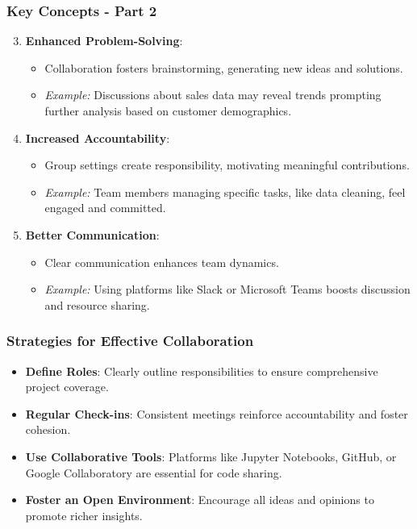 \documentclass[aspectratio=169]{beamer}
\begin{document}
\begin{frame}[fragile]
    \frametitle{Key Concepts - Part 2}
    \begin{enumerate}
        \setcounter{enumi}{2}
        \item \textbf{Enhanced Problem-Solving}:
            \begin{itemize}
                \item Collaboration fosters brainstorming, generating new ideas and solutions.
                \item \textit{Example:} Discussions about sales data may reveal trends prompting further analysis based on customer demographics.
            \end{itemize}

        \item \textbf{Increased Accountability}:
            \begin{itemize}
                \item Group settings create responsibility, motivating meaningful contributions.
                \item \textit{Example:} Team members managing specific tasks, like data cleaning, feel engaged and committed.
            \end{itemize}

        \item \textbf{Better Communication}:
            \begin{itemize}
                \item Clear communication enhances team dynamics.
                \item \textit{Example:} Using platforms like Slack or Microsoft Teams boosts discussion and resource sharing.
            \end{itemize}
    \end{enumerate}
\end{frame}

\begin{frame}[fragile]
    \frametitle{Strategies for Effective Collaboration}
    \begin{itemize}
        \item \textbf{Define Roles}: Clearly outline responsibilities to ensure comprehensive project coverage.
        \item \textbf{Regular Check-ins}: Consistent meetings reinforce accountability and foster cohesion.
        \item \textbf{Use Collaborative Tools}: Platforms like Jupyter Notebooks, GitHub, or Google Collaboratory are essential for code sharing.
        \item \textbf{Foster an Open Environment}: Encourage all ideas and opinions to promote richer insights.
    \end{itemize}
\end{frame}
\end{document}
